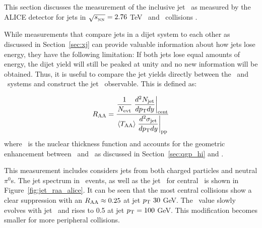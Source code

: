 
This section discusses the measurement of the inclusive jet \RAA\ as measured by the ALICE detector for jets in $\mbox{$\sqrt{s_{_\text{NN}}}$}=2.76$ TeV \pbpb\ and \pp\ collisions \cite{Reed_2013}.

While measurements that compare jets in a dijet system to each other as discussed in Section~\ref{sec:xj} can provide valuable information about how jets lose energy, they have the following limitation: If both jets lose equal amounts of energy, the dijet yield will still be peaked at unity and no new information will be obtained.
Thus, it is useful to compare the jet yields directly between the \pp\ and \pbpb\ systems and construct the jet \RAA\ observable.
This is defined as:

\begin{align}
\mbox{$R_{\rm AA}$}  = \dfrac{\dfrac{1}{N_{\rm evt}} \left.
\dfrac{d^2 N_{\rm jet}}{d\mbox{$p_{\mathrm{T}}$} dy} \right|_{\rm cent}}{ \langle T_{\rm AA} \rangle \left.
\dfrac{d^2\sigma_{\rm jet}}{d\mbox{$p_{\mathrm{T}}$} dy} \right|_{\rm pp}}
\end{align}
where \TAA\ is the nuclear thickness function and accounts for the geometric enhancement between \pp\ and \pbpb\ as discussed in Section~\ref{sec:qgp_hi} and \cite{doi:10.1146/annurev.nucl.57.090506.123020}.

This measurement includes considers jets from both charged particles and neutral $\pi^0$s.
The jet spectrum in \pbpb\ events, as well as the jet \RAA\ for central \pbpb\ is shown in Figure~\ref{fig:jet_raa_alice}.
It can be seen that the most central collisions show a clear suppression with an $\mbox{$R_{\rm AA}$} \approx 0.25$ at jet $\mbox{$p_{\mathrm{T}}$}\ 30$ GeV.
The \RAA\ value slowly evolves with jet \pt\ and rises to 0.5 at jet $\mbox{$p_{\mathrm{T}}$} = 100$ GeV.
This modification becomes smaller for more peripheral collisions.

